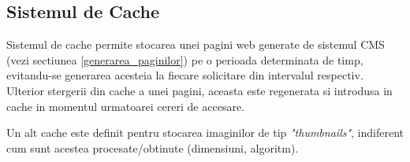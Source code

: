\subsection{Sistemul de Cache}

Sistemul de cache permite stocarea unei pagini web generate de sistemul CMS (vezi sectiunea \ref{generarea_paginilor}) 
pe o perioada determinata de timp, evitandu-se generarea acesteia la fiecare solicitare din intervalul respectiv. 
Ulterior stergerii din cache a unei pagini, aceasta este regenerata si introdusa in cache in momentul urmatoarei cereri de accesare.

Un alt cache este definit pentru stocarea imaginilor de tip \emph{"thumbnails"}, indiferent cum sunt acestea procesate/obtinute (dimensiuni, algoritm).